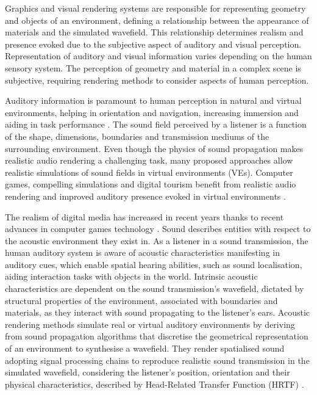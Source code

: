 Graphics and visual rendering systems are responsible for representing geometry and objects of an environment, defining a relationship between the appearance of materials and the simulated wavefield. This relationship determines realism and presence evoked due to the subjective aspect of auditory and visual perception.
Representation of auditory and visual information varies depending on the human sensory system. The perception of geometry and material in a complex scene is subjective, requiring rendering methods to consider aspects of human perception. 

Auditory information is paramount to human perception in natural and virtual environments, helping in orientation and navigation, increasing immersion and aiding in task performance \citep{lokki2005navigation, bork2015auditory, shivappa2016efficient}. The sound field perceived by a listener is a function of the shape, dimensions, boundaries and transmission mediums of the surrounding environment. Even though the physics of sound propagation makes realistic audio rendering a challenging task, many proposed approaches allow realistic simulations of sound fields in virtual environments (VEs). Computer games, compelling simulations and digital tourism benefit from realistic audio rendering and improved auditory presence evoked in virtual environments \cite{lokki2002creating, selmanovic2020vr}.

The realism of digital media has increased in recent years thanks to recent advances in computer games technology \cite{rubio2017immersive}. Sound describes entities with respect to the acoustic environment they exist in. As a listener in a sound transmission, the human auditory system is aware of acoustic characteristics manifesting in auditory cues, which enable spatial hearing abilities, such as sound localisation, aiding interaction tasks with objects in the world. Intrinsic acoustic characteristics are dependent on the sound transmission's wavefield, dictated by structural properties of the environment, associated with boundaries and materials, as they interact with sound propagating to the listener's ears. Acoustic rendering methods simulate real or virtual auditory environments by deriving from sound propagation algorithms that discretise the geometrical representation of an environment to synthesise a wavefield. They render spatialised sound adopting signal processing chains to reproduce realistic sound transmission in the simulated wavefield, considering the listener's position, orientation and their physical characteristics, described by Head-Related Transfer Function (HRTF) \cite{hulusic2012acoustic}. \par

